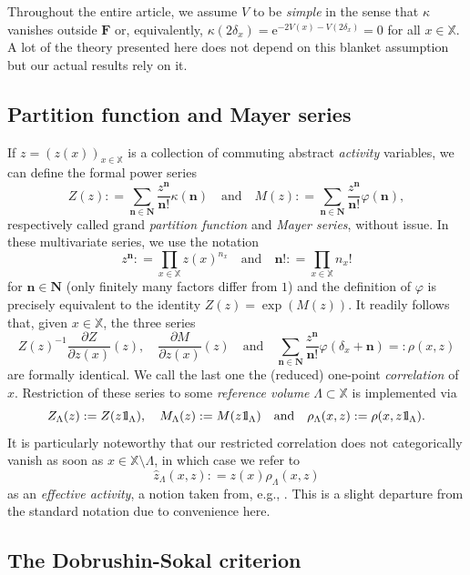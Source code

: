 \documentclass[reqno, 11pt]{amsart}
\theoremstyle{definition}
\newcommand{\e}{\mathrm{e}}
\newcommand{\X}{\mathbb X}
\def\1{{\mathchoice {1\mskip-4mu\mathrm l}      
{1\mskip-4mu\mathrm l}
{1\mskip-4.5mu\mathrm l} {1\mskip-5mu\mathrm l}}}
\begin{document}
Throughout the entire article, we assume $V$ to be \emph{simple} in the sense that $\kappa$ vanishes outside $\mathbf F$ or, equivalently, $\kappa(2 \delta_x) = \e^{- 2 V(x) - V(2 \delta_x)} = 0$ for all $x \in \X$. 
A lot of the theory presented here does not depend on this blanket assumption but our actual results rely on it.

\subsection{Partition function and Mayer series}

If $z = (z(x))_{x \in \X}$ is a collection of commuting abstract \emph{activity} variables, we can define the formal power series
\[
	Z(z) : = \sum_{\mathbf n \in \mathbf N} \frac{z^\mathbf n}{\mathbf n!} \kappa(\mathbf n) \quad \text{and} \quad M(z) : = \sum_{\mathbf n \in \mathbf N} \frac{z^\mathbf n}{\mathbf n!} \varphi(\mathbf n),
\]
respectively called grand \emph{partition function} and \emph{Mayer series}, without issue. 
In these multivariate series, we use the notation
\[
	z^\mathbf n : = \prod_{x \in \X} z(x)^{n_x} \quad \text{and} \quad \mathbf n! : = \prod_{x \in \X} n_x!
\]
for $\mathbf n \in \mathbf N$ (only finitely many factors differ from $1$) and the definition of $\varphi$ is precisely equivalent to the identity $Z(z) = \exp(M(z))$. 
It readily follows that, given $x \in \X$, the three series
\[
	Z(z)^{-1} \frac{\partial Z}{\partial z(x)} (z), \quad \frac{\partial M}{\partial z(x)} (z) \quad \text{and} \quad \sum_{\mathbf n \in \mathbf N} \frac{z^\mathbf n}{\mathbf n!} \varphi(\delta_x + \mathbf n) = : \rho(x, z)
\]
are formally identical. 
We call the last one the (reduced) one-point \emph{correlation} of $x$. 
Restriction of these series to some \emph{reference volume} $\Lambda \subset \X$ is implemented via
\[
	Z_\Lambda(z) : = Z(z \1_\Lambda), \quad M_\Lambda(z) : = M(z \1_\Lambda) \quad \text{and} \quad \rho_\Lambda(x, z) : = \rho(x, z \1_\Lambda).
\]
It is particularly noteworthy that our restricted correlation does not categorically vanish as soon as $x \in \X \setminus \Lambda$, in which case we refer to
\[
	\widehat z_\Lambda(x, z) :  = z(x) \rho_\Lambda(x, z)
\]
as an \emph{effective activity}, a notion taken from, e.g., \cite{ref:scott-sokal, ref:jansen-tsagkarogiannis, ref:jansen-hierarchical, ref:jansen-neumann}. 
This is a slight departure from the standard notation due to convenience here.

\subsection{The Dobrushin-Sokal criterion}
\end{document}
